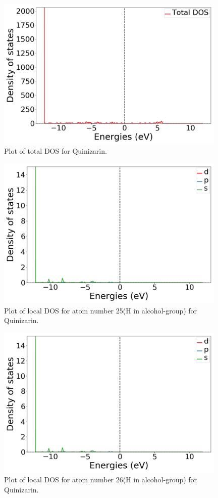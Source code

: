 \documentclass{article}
\begin{document}
  \begin{figure}[H]
      \centering
      \includegraphics[width = 11cm]{../fig/basic_TDOS_1.png}
      \caption{Plot of total DOS for Quinizarin. }
      \label{fig:basic_TDOS_1}
  \end{figure}

  \begin{figure}[H]
      \centering
      \includegraphics[width = 11cm]{../fig/basic_LDOS25_1.png}
      \caption{Plot of local DOS for atom number 25(H in alcohol-group) for Quinizarin.}
      \label{fig:basic_LDOS25_1}
  \end{figure}

  \begin{figure}[H]
      \centering
      \includegraphics[width = 11cm]{../fig/basic_LDOS26_1.png}
      \caption{Plot of local DOS for atom number 26(H in alcohol-group) for Quinizarin. }
      \label{fig:basic_LDOS26_1}
  \end{figure}
\end{document}
